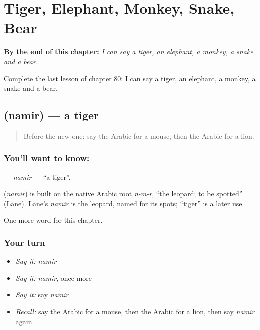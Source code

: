 
\chapter{Tiger, Elephant, Monkey, Snake, Bear}
\label{ch:ar-tiger-elephant-monkey-snake-bear}

\begin{chapteropening}
\textbf{By the end of this chapter:} \emph{I can say a tiger, an elephant, a monkey, a snake and a bear.}

Complete the last lesson of chapter 80: I can say a tiger, an elephant, a monkey, a snake and a bear.
\end{chapteropening}

\section[\texorpdfstring{\ar{نمر} (namir)}{نمر (namir)}]{ (namir) — a tiger}

\label{lesson:AR-C80-namir}



\begin{quote}
Before the new one: say the Arabic for a mouse, then the Arabic for a lion.
\end{quote}

\subsection*{You'll want to know: }
\textbf{} — \emph{namir} — \textquotedblleft{}a tiger\textquotedblright{}.

\begin{cousinweb}
\textbf{} (\emph{namir}) is built on the native Arabic root \emph{n-m-r}, \textquotedblleft{}the leopard; to be spotted\textquotedblright{} (Lane). Lane's \emph{namir} is the leopard, named for its spots; \textquotedblleft{}tiger\textquotedblright{} is a later use.
\end{cousinweb}

\begin{grammarlens}[title={What you've built}]
One more word for this chapter.
\end{grammarlens}

\subsection*{Your turn}
\begin{itemize}
\raggedright
  \item \emph{Say it:} \emph{namir}
  \item \emph{Say it:} \emph{namir}, once more
  \item \emph{Say it:} say \emph{namir}
  \item \emph{Recall:} say the Arabic for a mouse, then the Arabic for a lion, then say \emph{namir} again
\end{itemize}

